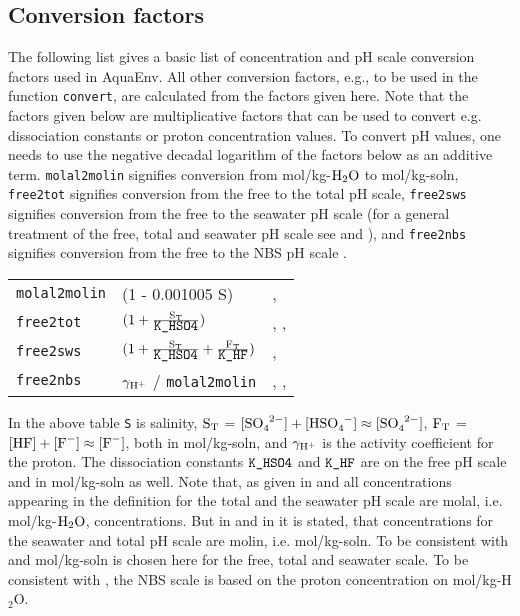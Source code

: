 \documentclass[a4paper]{article}
\begin{document}
\subsection{Conversion factors}
The following list gives a basic list of concentration and pH scale conversion factors used in \textsf{AquaEnv}. All other conversion factors, e.g., to be used in the function \texttt{convert}, are calculated from the factors given here. Note that the factors given below are multiplicative factors that can be used to convert e.g. dissociation constants or proton concentration values. To convert pH values, one needs to use the negative decadal logarithm of the factors below as an additive term. \texttt{molal2molin} signifies conversion from mol/kg-$\rm H_2O$ to mol/kg-soln, \texttt{free2tot} signifies conversion from the free to the total pH scale, \texttt{free2sws}  signifies conversion from the free to the seawater pH scale (for a general treatment of the free, total and seawater pH scale see \citet{Dickson1984} and \citet{Zeebe2001}), and \texttt{free2nbs} signifies conversion from the free to the NBS pH scale \citep{Durst1975}.
\begin{center}
\begin{tabular}{|llp{}|} \hline
\texttt{molal2molin} & (1 - 0.001005 S) & \citet[p. 257]{Roy1993a}, \citet[chap. 5, p. 15]{DOE1994}\\
\texttt{free2tot} & $\rm (1 + \frac{S_T}{\mbox{\texttt{K\_HSO4}}})$ &\citet[p. 2302]{Dickson1984}, \citet[chap. 5, p. 16]{DOE1994}, \citet[p. 57, p. 261]{Zeebe2001}\\
\texttt{free2sws} &  $\rm (1 + \frac{S_T}{\mbox{\texttt{K\_HSO4}}} + \frac{F_T}{\mbox{\texttt{K\_HF}}})$ & \citet[p. 2303]{Dickson1984}, \citet{Zeebe2001}\\
\texttt{free2nbs} &  $\rm \gamma_{\rm H^+}$ / \texttt{molal2molin} & \citet{Dickson1984}, \citet{Lewis1998}, \citet{Zeebe2001}\\ \hline
\end{tabular}
\end{center}
In the above table \texttt{S} is salinity, $\rm S_T$ = $[\ce{SO_4^{2-}}] + [\ce{HSO_4^-}] \approx [\ce{SO_4^{2-}}]$, $\rm F_T$ = $\rm [\ce{HF}] + [\ce{F^-}] \approx [\ce{F^-}]$, both in mol/kg-soln, and $\rm \gamma_{\rm H^+}$ is the activity coefficient for the proton. The dissociation constants $\mbox{\texttt{K\_HSO4}}$ and $\mbox{\texttt{K\_HF}}$ are on the free pH scale and in mol/kg-soln as well. Note that, as given in \citet[p. 2303]{Dickson1984} and \citet[p. 91f]{Dickson1979} all concentrations appearing in the definition for the total and the seawater pH scale are molal, i.e.  mol/kg-$\rm H_2O$, concentrations. But in \citet[p. 257]{Roy1993a} and in \citet[chap.. 4, SOP 6, p. 1]{DOE1994} it is stated, that concentrations for the seawater and total pH scale are molin, i.e. mol/kg-soln. To be consistent with \citet{DOE1994} and \cite{Dickson2007} mol/kg-soln is chosen here for the free, total and seawater scale. To be consistent with \cite{Lewis1998}, the NBS scale is based on the proton concentration on mol/kg-H$_2$O.
\end{document}
